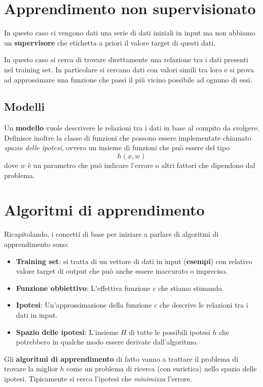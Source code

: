 \section{Apprendimento non supervisionato}
In questo caso ci vengono dati una serie di dati iniziali in input ma non abbiamo un \textbf{supervisore} che etichetta
a priori il valore target di questi dati.

In questo caso si cerca di trovare direttamente una relazione tra i dati presenti nel training set. In particolare si
cercano dati con valori simili tra loro e si prova ad approssimare una funzione che passi il pi\`u vicino possibile ad
ognuno di essi.

\subsection{Modelli}
Un \textbf{modello} vuole descrivere le relazioni tra i dati in base al compito da svolgere. Definisce inoltre la classe
di funzioni che possono essere implementate chiamato \emph{spazio delle ipotesi}, ovvero un insieme di funzioni
che pu\`o essere del tipo
\[ h(x, w) \]
dove $w$ \`e un parametro che pu\`o indicare l'errore o altri fattori che dipendono dal problema.

\section{Algoritmi di apprendimento}
Ricapitolando, i concetti di base per iniziare a parlare di algoritmi di apprendimento sono:
\begin{itemize}
	\item \textbf{Training set}: si tratta di un vettore di dati in input (\textbf{esempi}) con relativo valore target di
	      output che pu\`o anche essere inaccurato o impreciso.
	\item \textbf{Funzione obbiettivo}: L'effettiva funzione $c$ che stiamo stimando.
	\item \textbf{Ipotesi}: Un'approssimazione della funzione $c$ che descrive le relazioni tra i dati in input.
	\item \textbf{Spazio delle ipotesi}: L'insieme $H$ di tutte le possibili ipotesi $h$ che potrebbero in qualche modo
	      essere derivate dall'algoritmo.
\end{itemize}

Gli \textbf{algoritmi di apprendimento} di fatto vanno a trattare il problema di trovare la miglior $h$ come un problema
di ricerca (con euristica) nello spazio delle ipotesi. Tipicamente si cerca l'ipotesi che \emph{minimizza} l'errore.

